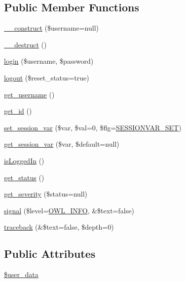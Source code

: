 \subsection*{Public Member Functions}
\begin{DoxyCompactItemize}
\item 
\hyperlink{classUser_ab8a717f17626301cc8b7815a43ea5b5b}{\_\-\_\-construct} (\$username=null)
\item 
\hyperlink{classUser_accd20149a7414612c1505e022eb63ffc}{\_\-\_\-destruct} ()
\item 
\hyperlink{classUser_a2c4fae5935ebf84e787126795bf42988}{login} (\$username, \$password)
\item 
\hyperlink{classUser_a95e19a7d141f922c2870a6404ff641b1}{logout} (\$reset\_\-status=true)
\item 
\hyperlink{classUser_a1348ddf190d4df2518665fb51305a902}{get\_\-username} ()
\item 
\hyperlink{classUser_a21bee530c9f8304e9e74e274f0f655af}{get\_\-id} ()
\item 
\hyperlink{classUser_a80108765c46ddec1ab776a774ae07f53}{set\_\-session\_\-var} (\$var, \$val=0, \$flg=\hyperlink{class_8sessionhandler_8php_af9e860b1663497a46177b0ec35d6a9f5}{SESSIONVAR\_\-SET})
\item 
\hyperlink{classUser_a84f3693077e777cc1d61b45fcecdb36c}{get\_\-session\_\-var} (\$var, \$default=null)
\item 
\hyperlink{classUserHandler_a4539c12ed2ce12a9147d61496854d5ab}{isLoggedIn} ()
\item 
\hyperlink{class__OWL_a99ec771fa2c5c279f80152cc09e489a8}{get\_\-status} ()
\item 
\hyperlink{class__OWL_adf9509ef96858be7bdd9414c5ef129aa}{get\_\-severity} (\$status=null)
\item 
\hyperlink{class__OWL_a51ba4a16409acf2a2f61f286939091a5}{signal} (\$level=\hyperlink{owl_8severitycodes_8php_a139328861128689f2f4def6a399d9057}{OWL\_\-INFO}, \&\$text=false)
\item 
\hyperlink{class__OWL_aa29547995d6741b7d2b90c1d4ea99a13}{traceback} (\&\$text=false, \$depth=0)
\end{DoxyCompactItemize}
\subsection*{Public Attributes}
\begin{DoxyCompactItemize}
\item 
\hyperlink{classUserHandler_ae7a2d59eee65560ac96b860e828bb445}{\$user\_\-data}
\end{DoxyCompactItemize}
